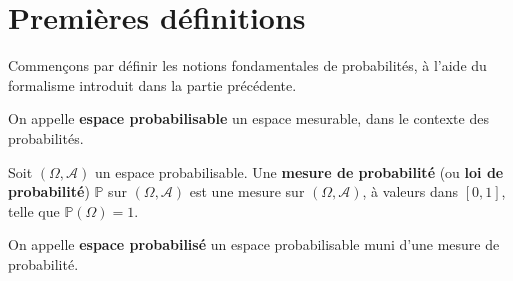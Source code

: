 \documentclass[../integ-proba.tex]{subfiles}
\begin{document}
\section{Premières définitions}

Commençons par définir les notions fondamentales de probabilités, à l'aide du formalisme introduit dans la partie précédente.

\begin{defi}
    On appelle \textbf{espace probabilisable} un espace mesurable, dans le contexte des probabilités.
\end{defi}

\begin{defi}
    Soit $\left(\Omega, \mathcal{A}\right)$ un espace probabilisable.
    Une \textbf{mesure de probabilité} (ou \textbf{loi de probabilité}) $\mathbb{P}$ sur $\left(\Omega, \mathcal{A}\right)$ est une mesure sur $\left(\Omega, \mathcal{A}\right)$, à valeurs dans $\left[0,1\right]$, telle que $\mathbb{P}\left(\Omega\right)=1$.
\end{defi}

\begin{defi}
    On appelle \textbf{espace probabilisé} un espace probabilisable muni d'une mesure de probabilité.
\end{defi}
\end{document}
